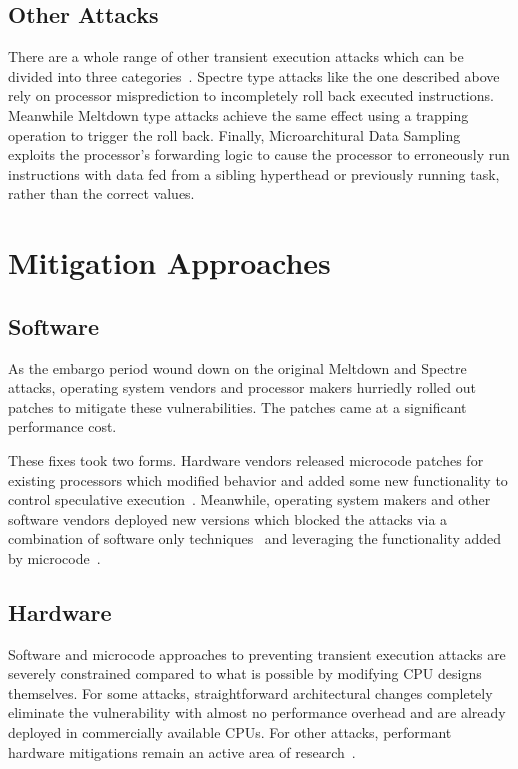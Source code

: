 \subsection{Other Attacks}
There are a whole range of other transient execution attacks which can be divided into three categories~\cite{hill:survey}.
Spectre type attacks like the one described above rely on processor misprediction to incompletely roll back executed instructions.
Meanwhile Meltdown type attacks achieve the same effect using a trapping operation to trigger the roll back.
Finally, Microarchitural Data Sampling exploits the processor's forwarding logic to cause the processor to erroneously run instructions with data fed from a sibling hyperthead or previously running task, rather than the correct values.

\section{Mitigation Approaches}
\subsection{Software}
As the embargo period wound down on the original Meltdown and Spectre attacks, operating system vendors and processor makers hurriedly rolled out patches to mitigate these vulnerabilities.
The patches came at a significant performance cost. 

These fixes took two forms.
Hardware vendors released microcode patches for existing processors which modified behavior and added some new functionality to control speculative execution~\cite{intel:l1tf}.
Meanwhile, operating system makers and other software vendors deployed new versions which blocked the attacks via a combination of software only techniques~\cite{intel:retpoline, linux:kpti} and leveraging the functionality added by microcode~\cite{intel:l1tf}.

\subsection{Hardware}
Software and microcode approaches to preventing transient execution attacks are severely constrained compared to what is possible by modifying CPU designs themselves.
For some attacks, straightforward architectural changes completely eliminate the vulnerability with almost no performance overhead and are already deployed in commercially available CPUs.
For other attacks, performant hardware mitigations remain an active area of research~\cite{OISA, ConTExT}.

